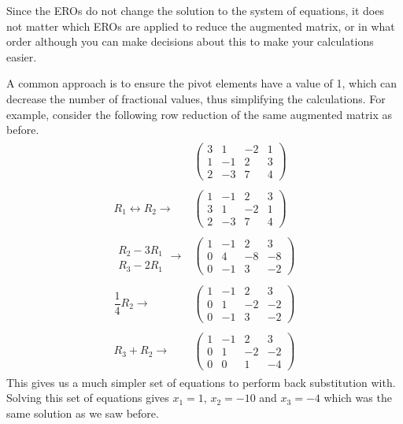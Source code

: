 \documentclass[letterpaper,10pt,english]{jupyterBook}
\begin{document}
\sphinxAtStartPar
Since the EROs do not change the solution to the system of equations, it does not matter which EROs are applied to reduce the augmented matrix, or in what order \sphinxhyphen{} although you can make decisions about this to make your calculations easier.

\sphinxAtStartPar
A common approach is to ensure the pivot elements have a value of 1, which can decrease the number of fractional values, thus simplifying the calculations. For example, consider the following row reduction of the same augmented matrix as before.
\begin{equation*}
\begin{split} \begin{align*}
    & \left( \begin{array}{ccc|c}
        3 & 1 & -2 & 1 \\
        1 & -1 & 2 & 3 \\
        2 & -3 & 7 & 4
    \end{array} \right)
    \\ \\
    R_1 \leftrightarrow R_2 \longrightarrow &
    \left( \begin{array}{ccc|c}
        1 & -1 & 2 & 3 \\
        3 & 1 & -2 & 1 \\
        2 & -3 & 7 & 4
    \end{array} \right) 
    \\ \\
    
        \begin{array}{l} \\ R_2 - 3 R_1 \\ R_3 - 2 R_1 \end{array} \longrightarrow &
    \left( \begin{array}{ccc|c}
        1 & -1 & 2 & 3 \\
        0 & 4 & -8 & -8 \\
        0 & -1 & 3 & -2
    \end{array} \right)
	  \\ \\
    \dfrac{1}{4}R_2  \longrightarrow &
    \left( \begin{array}{ccc|c}
        1 & -1 & 2 & 3 \\
        0 & 1 & -2 & -2 \\
        0 & -1 & 3 & -2
    \end{array} \right)
	\\ \\
     R_3 + R_2 \longrightarrow &
    \left( \begin{array}{ccc|c}
        1 & -1 & 2 & 3 \\
        0 & 1 & -2 & -2 \\
        0 & 0 & 1 & -4
    \end{array} \right)
\end{align*} \end{split}
\end{equation*}
\sphinxAtStartPar
This gives us a much simpler set of equations to perform back substitution with. Solving this set of equations gives \(x_1 = 1\), \(x_2 = -10\) and \(x_3 = -4\) which was the same solution as we saw before.
\end{document}
